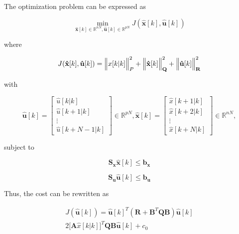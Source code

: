 The optimization problem can be expressed as

\begin{equation}
	\min_{\mathbf{\hat{x}}[k] \in \mathbb{R}^{nN}, \mathbf{\hat{u}}[k] \in \mathbb{R}^{pN}} J(\mathbf{\hat{x}}[k],\mathbf{\hat{u}}[k])
\end{equation}

\noindent
where

\noindent
\begin{equation}
    J(\mathbf{\hat{x}}[k], \mathbf{\hat{u}}[k]) = \Big\Vert x[k|k] \Big\Vert^2_{P} + \Big\Vert \mathbf{\hat{x}}[k] \Big\Vert^2_{\mathbf{Q}} + \Big\Vert \mathbf{\hat{u}}[k] \Big\Vert^2_{\mathbf{R}}
\end{equation}

\noindent
with

\noindent
\begin{equation}
    \mathbf{\hat{u}}[k] = \left[ \begin{matrix} \hat{u}[k|k] \\ \hat{u}[k + 1|k] \\ \vdots \\ \hat{u}[k + N - 1|k] \end{matrix} \right] \in \mathbb{R}^{pN},
    \mathbf{\hat{x}}[k] = \left[ \begin{matrix} \hat{x}[k + 1|k] \\ \hat{x}[k + 2|k] \\ \vdots \\ \hat{x}[k + N|k] \end{matrix} \right] \in \mathbb{R}^{nN},
\end{equation}

\noindent
subject to

\noindent
\begin{equation}
    \mathbf{S_x} \mathbf{\hat{x}}[k] \leq \mathbf{b_x}
\end{equation}

\noindent
\begin{equation}
    \mathbf{S_u} \mathbf{\hat{u}}[k] \leq \mathbf{b_u}
\end{equation}

Thus, the cost can be rewritten as

    \noindent
    \begin{gather}
        J(\mathbf{\hat{u}}[k]) = \mathbf{\hat{u}}[k]^T(\mathbf{R} + \mathbf{B}^T \mathbf{Q} \mathbf{B} )\mathbf{\hat{u}}[k] \nonumber \\ 
        2 \Big[ \mathbf{A} \hat{x}[k|k] \Big]^T \mathbf{Q} \mathbf{B} \mathbf{\hat{u}}[k] + c_0 \nonumber
    \end{gather}

